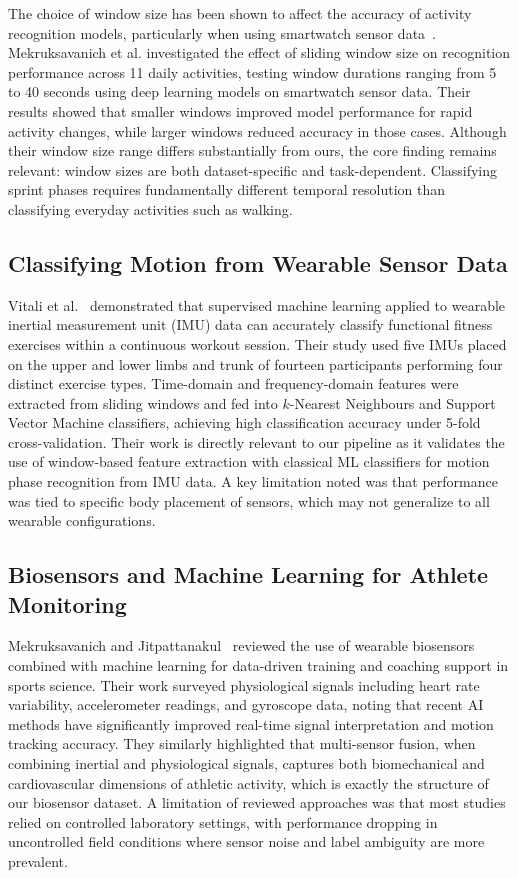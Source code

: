 \documentclass[12pt,a4paper]{cibb}
\begin{document}
The choice of window size has been shown to affect the accuracy of 
activity recognition models, particularly when using smartwatch sensor 
data~\cite{10689691}. Mekruksavanich et al. investigated the effect of 
sliding window size on recognition performance across 11 daily activities, 
testing window durations ranging from 5 to 40 seconds using deep learning 
models on smartwatch sensor data. Their results showed that smaller windows 
improved model performance for rapid activity changes, while larger windows 
reduced accuracy in those cases. Although their window size range differs 
substantially from ours, the core finding remains relevant: window sizes 
are both dataset-specific and task-dependent. Classifying sprint phases 
requires fundamentally different temporal resolution than classifying 
everyday activities such as walking.

\subsection{Classifying Motion from Wearable Sensor Data}

Vitali et al.~\cite{Vitali2020} demonstrated that supervised machine 
learning applied to wearable inertial measurement unit (IMU) data can 
accurately classify functional fitness exercises within a continuous 
workout session. Their study used five IMUs placed on the upper and lower 
limbs and trunk of fourteen participants performing four distinct exercise 
types. Time-domain and frequency-domain features were extracted from 
sliding windows and fed into $k$-Nearest Neighbours and Support Vector 
Machine classifiers, achieving high classification accuracy under 
5-fold cross-validation. Their work is directly relevant to our pipeline 
as it validates the use of window-based feature extraction with classical 
ML classifiers for motion phase recognition from IMU data. A key 
limitation noted was that performance was tied to specific body placement 
of sensors, which may not generalize to all wearable configurations.

\subsection{Biosensors and Machine Learning for Athlete Monitoring}

Mekruksavanich and Jitpattanakul~\cite{Mekruksavanich2026} reviewed 
the use of wearable biosensors combined with machine learning for 
data-driven training and coaching support in sports science. Their work 
surveyed physiological signals including heart rate variability, 
accelerometer readings, and gyroscope data, noting that recent AI 
methods have significantly improved real-time signal interpretation and 
motion tracking accuracy. They similarly highlighted 
that multi-sensor fusion, when combining inertial and physiological signals, captures both biomechanical and cardiovascular dimensions of athletic 
activity, which is exactly the structure of our biosensor dataset. 
A limitation of reviewed approaches was that most studies relied on 
controlled laboratory settings, with performance dropping in uncontrolled 
field conditions where sensor noise and label ambiguity are more prevalent.
\end{document}
